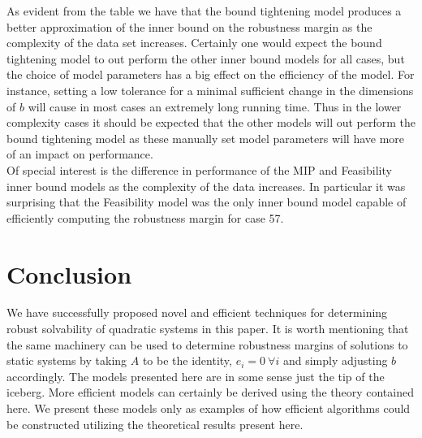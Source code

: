 \documentclass[11pt]{article}
\theoremstyle{plain}
\theoremstyle{definition}
\theoremstyle{remark}
\begin{document}
As evident from the table we have that the bound tightening model produces a better approximation of the inner bound on the robustness margin as the complexity of the data set increases. Certainly one would expect the bound tightening model to out perform the other inner bound models for all cases, but the choice of model parameters has a big effect on the efficiency of the model. For instance, setting a low tolerance for a minimal sufficient change in the dimensions of $b$ will cause in most cases an extremely long running time. Thus in the lower complexity cases it should be expected that the other models will out perform the bound tightening model as these manually set model parameters will have more of an impact on performance. \\
Of special interest is the difference in performance of the MIP and Feasibility inner bound models as the complexity of the data increases. In particular it was surprising that the Feasibility model was the only inner bound model capable of efficiently computing the robustness margin for case 57. 


\section{Conclusion}

We have successfully proposed novel and efficient techniques for determining robust solvability of quadratic systems in this paper. It is worth mentioning that the same machinery can be used to determine robustness margins of solutions to static systems by taking $A$ to be the identity, $e_i=0 \ \forall i$ and simply adjusting $b$ accordingly. The models presented here are in some sense just the tip of the iceberg. More efficient models can certainly be derived using the theory contained here. We present these models only as examples of how efficient algorithms could be constructed utilizing the theoretical results present here. \\
\end{document}
